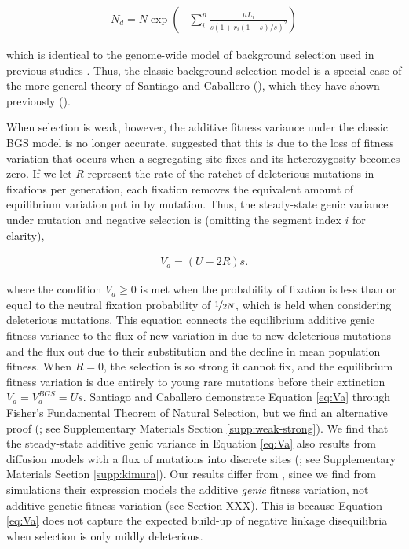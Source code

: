 \documentclass[11pt]{article}
\begin{document}
\begin{align}
    N_d = N \exp \left( - \sum_i^n \frac{\mu L_i}{s(1 + r_i(1-s)/s)^2} \right) 
\end{align}

which is identical to the genome-wide model of background selection used in
previous studies \parencite{McVicker2009-ax,Elyashiv2016-vt,Murphy2022-sj}.
Thus, the classic background selection model is a special case of the more
general theory of Santiago and Caballero (\citeyear{Santiago2016-mu}), which
they have shown previously (\citeyear{Santiago1998-bs}).

When selection is weak, however, the additive fitness variance under the
classic BGS model is no longer accurate. \parencite{Santiago2016-mu} suggested
that this is due to the loss of fitness variation that occurs when a
segregating site fixes and its heterozygosity becomes zero. If we let $R$
represent the rate of the ratchet of deleterious mutations in fixations per
generation, each fixation removes the equivalent amount of equilibrium
variation put in by mutation. Thus, the steady-state genic variance under
mutation and negative selection is (omitting the segment index $i$ for
clarity),

\begin{align}
  \label{eq:Va}
  V_{a} = (U - 2 R)s. 
\end{align}

where the condition $V_a \ge 0$ is met when the probability of fixation is less
than or equal to the neutral fixation probability of $\nicefrac{1}{2N}$, which
is held when considering deleterious mutations. This equation connects the
equilibrium additive genic fitness variance to the flux of new variation in due
to new deleterious mutations and the flux out due to their substitution and the
decline in mean population fitness. When $R=0$, the selection is so strong it
cannot fix, and the equilibrium fitness variation is due entirely to young rare
mutations before their extinction $V_a = V_a^{BGS} = Us$. Santiago and
Caballero demonstrate Equation \eqref{eq:Va} through Fisher's Fundamental
Theorem of Natural Selection, but we find an alternative proof
(\cite{Higgs1995-xc}; see Supplementary Materials Section
\ref{supp:weak-strong}). We find that the steady-state additive genic variance
in Equation \eqref{eq:Va} also results from diffusion models with a flux of
mutations into discrete sites (\cite{Kimura1969-jw}; see Supplementary
Materials Section \ref{supp:kimura}). Our results differ from
\parencite{Santiago2016-mu}, since we find from simulations their expression
models the additive \emph{genic} fitness variation, not additive genetic
fitness variation (see Section XXX). This is because Equation \eqref{eq:Va}
does not capture the expected build-up of negative linkage disequilibria when
selection is only mildly deleterious.
\end{document}
